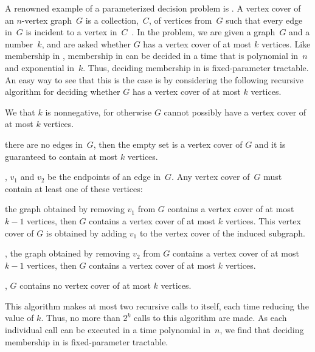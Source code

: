 A renowned example of a parameterized decision problem is .
A vertex cover of an $n$-vertex graph~$G$ is a collection,~$C$, of vertices from~$G$ such that every edge in~$G$ is incident to a vertex in~$C$~\parencite{diestel2017graph}.
In the  problem, we are given a graph~$G$ and a number~$k$, and are asked whether $G$ has a vertex cover of at most $k$ vertices.
Like membership in , membership in  can be decided in a time that is polynomial in~$n$ and exponential in~$k$.
Thus, deciding membership in  is fixed-parameter tractable.
An easy way to see that this is the case is by considering the following recursive algorithm for deciding whether $G$ has a vertex cover of at most $k$ vertices.
\pagebreak%
\begin{codelisting}
\item
  We  that $k$ is nonnegative, for otherwise $G$ cannot possibly have a vertex cover of at most $k$ vertices.
\item
   there are no edges in~$G$, then the empty set is a vertex cover of $G$ and it is guaranteed to contain at most $k$ vertices.
\item
  ,  $v_1$ and $v_2$ be the endpoints of an edge in~$G$.
  Any vertex cover of~$G$ must contain at least one of these vertices:
  \begin{codelisting}
  \item
     the graph obtained by removing $v_1$ from $G$ contains a vertex cover of at most $k - 1$ vertices, then $G$ contains a vertex cover of at most $k$ vertices.
    This vertex cover of $G$ is obtained by adding $v_1$ to the vertex cover of the induced subgraph.
  \item
    ,  the graph obtained by removing $v_2$ from $G$ contains a vertex cover of at most $k - 1$ vertices, then $G$ contains a vertex cover of at most $k$ vertices.
  \item
    , $G$ contains no vertex cover of at most $k$ vertices.
  \end{codelisting}
\end{codelisting}
This algorithm makes at most two recursive calls to itself, each time reducing the value of $k$.
Thus, no more than $2^k$ calls to this algorithm are made.
As each individual call can be executed in a time polynomial in~$n$, we find that deciding membership in  is fixed-parameter tractable.

